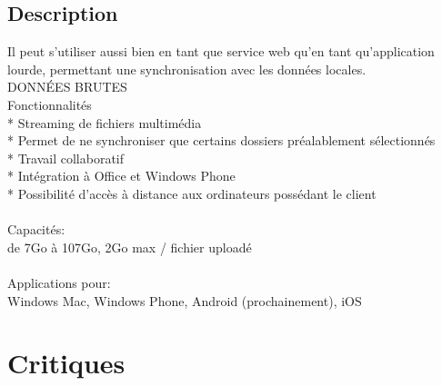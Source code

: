 \subsection{Description}
Il peut s'utiliser aussi bien en tant que service web qu'en tant qu'application lourde, permettant une synchronisation avec les données locales.\\
DONNÉES BRUTES\\
Fonctionnalités\\
* Streaming de fichiers multimédia\\
* Permet de ne synchroniser que certains dossiers préalablement sélectionnés\\
* Travail collaboratif\\
* Intégration à Office et Windows Phone\\
* Possibilité d'accès à distance aux ordinateurs possédant le client\\
\\
Capacités:\\
de 7Go à 107Go, 2Go max / fichier uploadé\\
\\
Applications pour:\\
Windows Mac, Windows Phone, Android (prochainement), iOS\\

\section{Critiques}